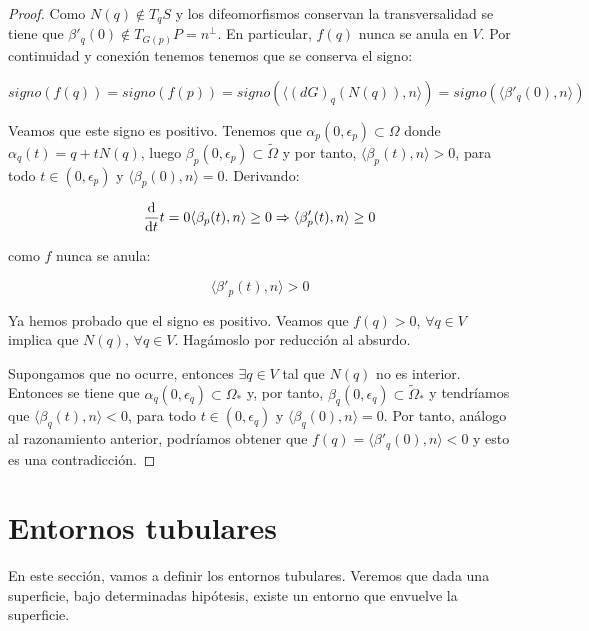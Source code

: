 \begin{proof}
Como $N(q) \not\in T_qS$ y los difeomorfismos conservan la transversalidad se tiene que $\beta'_q(0) \not\in T_{G(p)}P = n^\perp$. En particular, $f(q)$ nunca se anula en $V$. Por continuidad y conexión tenemos tenemos que se conserva el signo:

\begin{equation*}
    signo(f(q)) = signo(f(p)) = signo(\langle (dG)_q(N(q)), n \rangle) = signo(\langle \beta'_q(0), n \rangle)
\end{equation*}

Veamos que este signo es positivo. Tenemos que $\alpha_p(0, \epsilon_p) \subset \Omega$ donde $\alpha_q(t) = q + tN(q)$, luego $\beta_p(0, \epsilon_p) \subset \tilde{\Omega}$ y por tanto, $\langle \beta_p(t), n \rangle > 0$, para todo $t \in (0, \epsilon_p)$ y $\langle \beta_p(0), n \rangle = 0$. Derivando:

\begin{equation*}
    \diff{}{t}{t=0} \langle \beta_p(t), n \rangle \geq 0 \Rightarrow \langle \beta'_p(t), n \rangle \geq 0
\end{equation*}

como $f$ nunca se anula:

\begin{equation*}
    \langle \beta'_p(t), n \rangle > 0
\end{equation*}

Ya hemos probado que el signo es positivo. Veamos que $f(q) > 0$, $\forall q \in V$ implica que $N(q)$, $\forall q \in V$. Hagámoslo por reducción al absurdo.

Supongamos que no ocurre, entonces $\exists q \in V$ tal que $N(q)$ no es interior. Entonces se tiene que $\alpha_q(0, \epsilon_q) \subset \Omega_*$ y, por tanto, $\beta_q(0, \epsilon_q) \subset \tilde{\Omega}_*$ y tendríamos que $\langle \beta_q(t), n \rangle < 0$, para todo $t \in (0, \epsilon_q)$ y $\langle \beta_q(0), n \rangle = 0$. Por tanto, análogo al razonamiento anterior, podríamos obtener que $f(q) = \langle \beta'_q(0), n \rangle < 0$ y esto es una contradicción.

\end{proof}

\section{Entornos tubulares}

En este sección, vamos a definir los entornos tubulares. Veremos que dada una superficie, bajo determinadas hipótesis, existe un entorno que envuelve la superficie.

